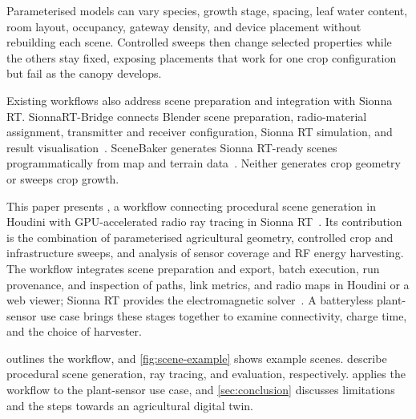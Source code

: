 Parameterised models can vary species, growth stage, spacing, leaf water content, room layout, occupancy, gateway density, and device placement without rebuilding each scene. Controlled sweeps then change selected properties while the others stay fixed, exposing placements that work for one crop configuration but fail as the canopy develops.
   

Existing workflows also address scene preparation and integration with Sionna RT. SionnaRT-Bridge connects Blender scene preparation, radio-material assignment, transmitter and receiver configuration, Sionna RT simulation, and result visualisation~\cite{ribas2026sionnartbridge}. SceneBaker generates Sionna RT-ready scenes programmatically from map and terrain data~\cite{lyu2026scenebaker}. Neither generates crop geometry or sweeps crop growth.

This paper presents \housionna{}, a workflow connecting procedural scene generation in Houdini with GPU-accelerated radio ray tracing in Sionna RT~\cite{housionna}. Its contribution is the combination of parameterised agricultural geometry, controlled crop and infrastructure sweeps, and analysis of sensor coverage and RF energy harvesting. The workflow integrates scene preparation and export, batch execution, run provenance, and inspection of paths, link metrics, and radio maps in Houdini or a web viewer; Sionna RT provides the electromagnetic solver~\cite{hoydis2023,aoudia2025}. A batteryless plant-sensor use case brings these stages together to examine connectivity, charge time, and the choice of harvester.

 outlines the workflow, and \cref{fig:scene-example} shows example scenes.  describe procedural scene generation, ray tracing, and evaluation, respectively.  applies the workflow to the plant-sensor use case, and \cref{sec:conclusion} discusses limitations and the steps towards an agricultural digital twin.



